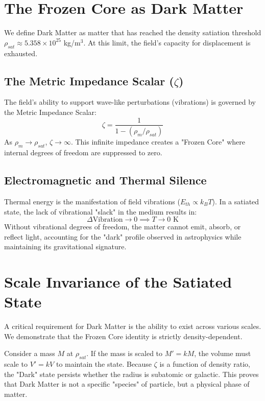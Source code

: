 \documentclass[12pt,a4paper]{article}
\begin{document}
\section{The Frozen Core as Dark Matter}
We define Dark Matter as matter that has reached the density satiation threshold $\rho_{sat} \approx 5.358 \times 10^{25}$ kg/m$^3$. At this limit, the field's capacity for displacement is exhausted.

\subsection{The Metric Impedance Scalar ($\zeta$)}
The field’s ability to support wave-like perturbations (vibrations) is governed by the Metric Impedance Scalar:
\begin{equation}
\zeta = \frac{1}{1 - (\rho_m / \rho_{sat})}
\end{equation}
As $\rho_m \to \rho_{sat}$, $\zeta \to \infty$. This infinite impedance creates a "Frozen Core" where internal degrees of freedom are suppressed to zero.

\subsection{Electromagnetic and Thermal Silence}
Thermal energy is the manifestation of field vibrations ($E_{th} \propto k_B T$). In a satiated state, the lack of vibrational "slack" in the medium results in:
\begin{equation}
\Delta \text{Vibration} \to 0 \implies T \to 0 \text{ K}
\end{equation}
Without vibrational degrees of freedom, the matter cannot emit, absorb, or reflect light, accounting for the "dark" profile observed in astrophysics while maintaining its gravitational signature.

\section{Scale Invariance of the Satiated State}
A critical requirement for Dark Matter is the ability to exist across various scales. We demonstrate that the Frozen Core identity is strictly density-dependent. 

Consider a mass $M$ at $\rho_{sat}$. If the mass is scaled to $M' = kM$, the volume must scale to $V' = kV$ to maintain the state. Because $\zeta$ is a function of density ratio, the "Dark" state persists whether the radius is subatomic or galactic. This proves that Dark Matter is not a specific "species" of particle, but a physical phase of matter.
\end{document}
